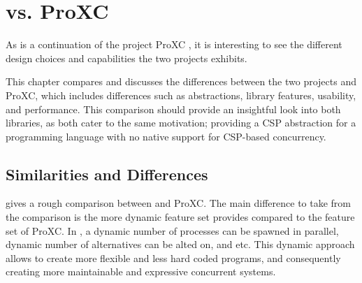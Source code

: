 

\chapter{\Proxc{} vs. ProXC}
\label{ch:proxc++_vs_proxc}

As \Proxc{} is a continuation of the project ProXC \citep{pettersen2016proxc}, it is interesting to see the different design choices and capabilities the two projects exhibits.

This chapter compares and discusses the differences between the two projects \Proxc{} and ProXC, which includes differences such as abstractions, library features, usability, and performance. This comparison should provide an insightful look into both libraries, as both cater to the same motivation; providing a CSP abstraction for a programming language with no native support for CSP\hyp{}based concurrency.


\section{Similarities and Differences}


 gives a rough comparison between \Proxc{} and ProXC. The main difference to take from the comparison is the more dynamic feature set \Proxc{} provides compared to the feature set of ProXC. In \Proxc{}, a dynamic number of processes can be spawned in parallel, dynamic number of alternatives can be alted on, and etc. This dynamic approach allows to create more flexible and less hard coded programs, and consequently creating more maintainable and expressive concurrent systems.

